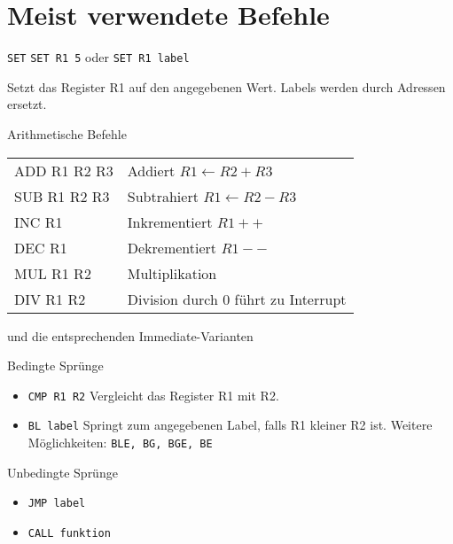 
\section{Meist verwendete Befehle}

\begin{frame}{\texttt{SET}}
 \texttt{SET R1 5} oder \texttt{SET R1 label}
 
 Setzt das Register R1 auf den angegebenen Wert. Labels werden durch Adressen ersetzt.
 
\end{frame}

\begin{frame}{Arithmetische Befehle}

\begin{center}
\begin{tabular}{@{\ttfamily\bfseries}ll}
ADD R1 R2 R3 & Addiert $R1 \gets R2 + R3$ \\
SUB R1 R2 R3 & Subtrahiert $R1 \gets R2 - R3$\\
INC R1       & Inkrementiert $R1++$\\
DEC R1       & Dekrementiert $R1--$\\
MUL R1 R2    & Multiplikation \\
DIV R1 R2    & Division durch 0 führt zu Interrupt
\end{tabular}
\end{center}
 
und die entsprechenden Immediate-Varianten
\end{frame}

\begin{frame}{Bedingte Sprünge}
\begin{itemize}
 \item{\texttt{\texttt{CMP R1 R2}}}
        Vergleicht das Register R1 mit R2.
 \item{\texttt{\texttt{BL label}}}
        Springt zum angegebenen Label, falls R1 kleiner R2 ist.
        Weitere Möglichkeiten: \texttt{BLE, BG, BGE, BE}
\end{itemize}


\end{frame}

\begin{frame}{Unbedingte Sprünge}
 \begin{itemize}
  \item \texttt{JMP label}
  \item \texttt{CALL funktion} 
 \end{itemize}
\end{frame}

